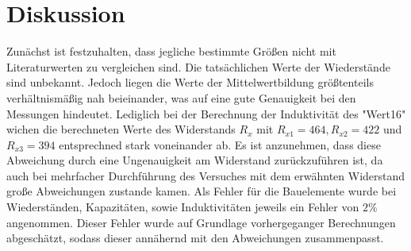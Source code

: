 \section{Diskussion}
\label{sec:Diskussion}

Zunächst ist festzuhalten, dass jegliche bestimmte Größen nicht mit Literaturwerten 
zu vergleichen sind. Die tatsächlichen Werte der Wiederstände sind unbekannt.
Jedoch liegen die Werte der Mittelwertbildung größtenteils verhältnismäßig nah
beieinander, was auf eine gute Genauigkeit bei den Messungen hindeutet. 
Lediglich bei der Berechnung der Induktivität des "Wert16" wichen die berechneten
Werte des Widerstands $R_x$ mit $R_{x1} = 464, R_{x2} = 422$ und $R_{x3} = 394$ 
entsprechned stark voneinander ab.
Es ist anzunehmen, dass diese Abweichung durch eine Ungenauigkeit am Widerstand 
zurückzuführen ist, da auch bei mehrfacher Durchführung des Versuches mit dem 
erwähnten Widerstand große Abweichungen zustande kamen.
Als Fehler für die Bauelemente wurde bei Wiederständen, Kapazitäten, sowie 
Induktivitäten jeweils ein Fehler von $2 \%$ angenommen. Dieser Fehler wurde
auf Grundlage vorhergeganger Berechnungen abgeschätzt, sodass dieser annähernd
mit den Abweichungen zusammenpasst.
